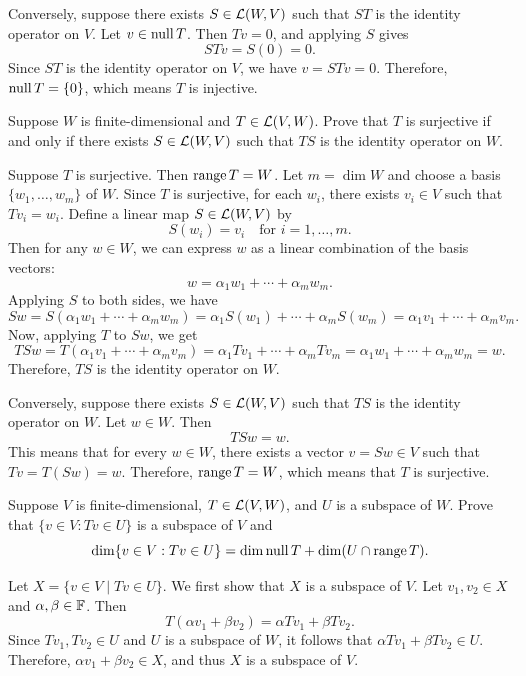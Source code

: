 \begin{exc}
\begin{solution}
Conversely, suppose there exists $S\in\mathcal{L}(W,V)$ such that $ST$ is the
identity operator on $V$. Let $v\in\operatorname{null} T$. Then $Tv=0$, and applying $S$
gives
\[ STv=S(0)=0. \]
Since $ST$ is the identity operator on $V$, we have $v=STv=0$. Therefore,
$\operatorname{null} T=\{0\}$, which means $T$ is injective.
\end{solution}

\begin{exercise}
Suppose $W$ is finite-dimensional and $T\in\mathcal{L}(V,W)$. Prove that $T$ is
surjective if and only if there exists $S\in\mathcal{L}(W,V)$ such that $TS$ is the
identity operator on $W$.
\end{exercise}
\begin{solution}
Suppose $T$ is surjective. Then $\operatorname{range} T=W$. Let $m=\dim W$ and choose a basis
$\{w_1,\dots,w_m\}$ of $W$. Since $T$ is surjective, for each $w_i$, there
exists $v_i\in V$ such that $Tv_i=w_i$. Define a linear map $S\in\mathcal{L}(W,V)$ by
\[ S(w_i)=v_i \quad\text{for } i=1,\dots,m. \]
Then for any $w\in W$, we can express $w$ as a linear combination of the basis
vectors:
\[ w=\alpha_1w_1+\cdots+\alpha_mw_m. \]
Applying $S$ to both sides, we have
\[ Sw=S(\alpha_1w_1+\cdots+\alpha_mw_m)=\alpha_1S(w_1)+\cdots+\alpha_mS(w_m)
   =\alpha_1v_1+\cdots+\alpha_mv_m. \]
Now, applying $T$ to $Sw$, we get
\[ TSw=T(\alpha_1v_1+\cdots+\alpha_mv_m)=\alpha_1Tv_1+\cdots+\alpha_mTv_m
   =\alpha_1w_1+\cdots+\alpha_mw_m=w. \]
Therefore, $TS$ is the identity operator on $W$.

Conversely, suppose there exists $S\in\mathcal{L}(W,V)$ such that $TS$ is the identity
operator on $W$. Let $w\in W$. Then
\[ TSw=w. \]
This means that for every $w\in W$, there exists a vector $v=Sw\in V$ such that
$Tv=T(Sw)=w$. Therefore, $\operatorname{range} T=W$, which means that $T$ is surjective.
\end{solution}

\begin{exercise}
Suppose $V$ is finite-dimensional, $T\in\mathcal{L}(V,W)$, and $U$ is a subspace of
$W$. Prove that $\{v\in V : Tv\in U\}$ is a subspace of $V$ and
\[ \operatorname{dim}\{v\in V : Tv\in U\}=\operatorname{dim}\operatorname{null} T+\operatorname{dim}(U\cap\operatorname{range} T). \]
\end{exercise}
\begin{solution}
Let $X=\{v\in V\mid Tv\in U\}$. We first show that $X$ is a subspace of $V$.
Let $v_1,v_2\in X$ and $\alpha,\beta\in\mathbb{F}$. Then
\[ T(\alpha v_1+\beta v_2)=\alpha Tv_1+\beta Tv_2. \]
Since $Tv_1,Tv_2\in U$ and $U$ is a subspace of $W$, it follows that
$\alpha Tv_1+\beta Tv_2\in U$. Therefore, $\alpha v_1+\beta v_2\in X$, and thus
$X$ is a subspace of $V$.


\end{solution}
\end{exc}
